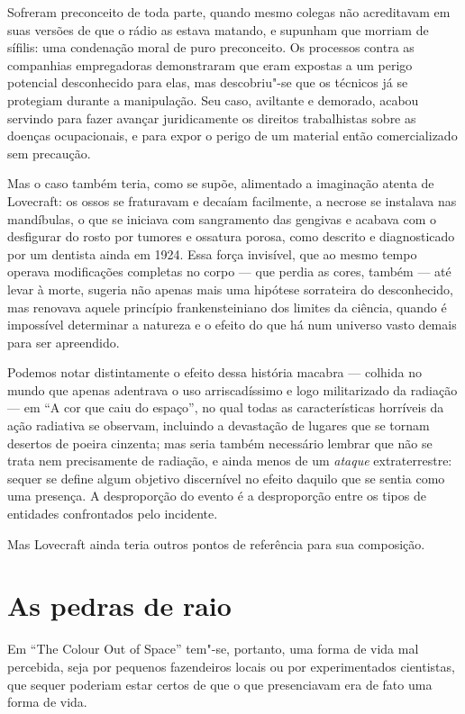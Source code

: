 Sofreram preconceito de toda parte, quando mesmo colegas não acreditavam
em suas versões de que o rádio as estava matando, e supunham que morriam
de sífilis: uma condenação moral de puro preconceito. Os processos
contra as companhias empregadoras demonstraram que eram expostas a um
perigo potencial desconhecido para elas, mas descobriu"-se que os
técnicos já se protegiam durante a manipulação. Seu caso, aviltante e
demorado, acabou servindo para fazer avançar juridicamente os direitos
trabalhistas sobre as doenças ocupacionais, e para expor o perigo de um
material então comercializado sem precaução.

Mas o caso também teria, como se supõe, alimentado a imaginação atenta
de Lovecraft: os ossos se fraturavam e decaíam facilmente, a necrose se
instalava nas mandíbulas, o que se iniciava com sangramento das gengivas
e acabava com o desfigurar do rosto por tumores e ossatura porosa, como
descrito e diagnosticado por um dentista ainda em 1924. Essa força
invisível, que ao mesmo tempo operava modificações completas no corpo
--- que perdia as cores, também --- até levar à morte, sugeria não
apenas mais uma hipótese sorrateira do desconhecido, mas renovava aquele
princípio frankensteiniano dos limites da ciência, quando é impossível
determinar a natureza e o efeito do que há num universo vasto demais
para ser apreendido.

Podemos notar distintamente o efeito dessa história macabra --- colhida
no mundo que apenas adentrava o uso arriscadíssimo e logo militarizado
da radiação --- em ``A cor que caiu do espaço'', no qual todas as
características horríveis da ação radiativa se observam, incluindo a
devastação de lugares que se tornam desertos de poeira cinzenta; mas
seria também necessário lembrar que não se trata nem precisamente de
radiação, e ainda menos de um \emph{ataque} extraterrestre: sequer se
define algum objetivo discernível no efeito daquilo que se sentia como
uma presença. A desproporção do evento é a desproporção entre os tipos
de entidades confrontados pelo incidente.

Mas Lovecraft ainda teria outros pontos de referência para sua
composição.

\section*{As pedras de raio}

Em ``The Colour Out of Space'' tem"-se, portanto, uma forma de vida mal
percebida, seja por pequenos fazendeiros locais ou por experimentados
cientistas, que sequer poderiam estar certos de que o que presenciavam
era de fato uma forma de vida.

